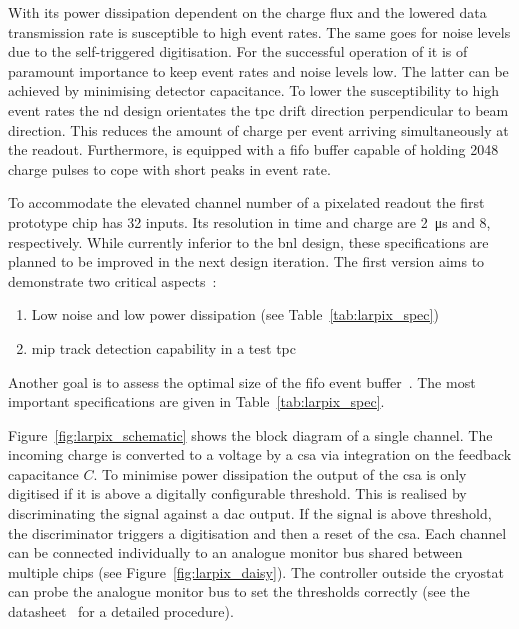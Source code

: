 With its power dissipation dependent on the charge flux and the lowered data transmission rate \larpix{} is susceptible to high event rates.
The same goes for noise levels due to the self-triggered digitisation.
For the successful operation of \larpix{} it is of paramount importance to keep event rates and noise levels low.
The latter can be achieved by minimising detector capacitance.
To lower the susceptibility to high event rates the \dune{} \gls{nd} design orientates the \gls{tpc} drift direction perpendicular to beam direction.
This reduces the amount of charge per event arriving simultaneously at the readout.
Furthermore, \larpix{} is equipped with a \gls{fifo} buffer capable of holding \num{2048} charge pulses to cope with short peaks in event rate.

To accommodate the elevated channel number of a pixelated readout the first \larpix{} prototype chip has \num{32} inputs.
Its resolution in time and charge are \SI{2}{\micro\second} and \SI{8}{\bit}, respectively.
While currently inferior to the \gls{bnl} design, these specifications are planned to be improved in the next design iteration.
The first \larpix{} version aims to demonstrate two critical aspects~\cite{dan_larpix_arcCM}:
\begin{enumerate}
	\item Low noise and low power dissipation (see Table~\ref{tab:larpix_spec})
	\item \gls{mip} track detection capability in a test \gls{tpc}
\end{enumerate}
Another goal is to assess the optimal size of the \gls{fifo} event buffer~\cite{danLarpix}.
The most important \larpix{} specifications are given in Table~\ref{tab:larpix_spec}.

Figure~\ref{fig:larpix_schematic} shows the block diagram of a single \larpix{} channel.
The incoming charge is converted to a voltage by a \gls{csa} via integration on the feedback capacitance $C$.
To minimise power dissipation the output of the \gls{csa} is only digitised if it is above a digitally configurable threshold.
This is realised by discriminating the signal against a \gls{dac} output.
If the signal is above threshold, the discriminator triggers a digitisation and then a reset of the \gls{csa}.
Each channel can be connected individually to an analogue monitor bus shared between multiple \larpix{} chips (see Figure~\ref{fig:larpix_daisy}).
The \larpix{} controller outside the cryostat can probe the analogue monitor bus to set the thresholds correctly (see the datasheet~\cite{larpix_spec} for a detailed procedure).

